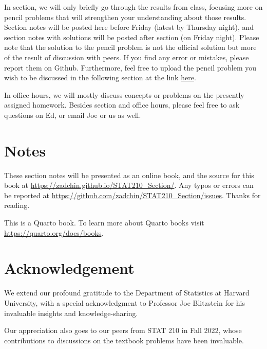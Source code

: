 \documentclass[
  letterpaper,
  DIV=11,
  numbers=noendperiod]{scrreprt}
\theoremstyle{definition}
\theoremstyle{plain}
\theoremstyle{remark}
\begin{document}
In section, we will only briefly go through the results from class,
focusing more on pencil problems that will strengthen your understanding
about those results. Section notes will be posted here before Friday
(latest by Thursday night), and section notes with solutions will be
posted after section (on Friday night). Please note that the solution to
the pencil problem is not the official solution but more of the result
of discussion with peers. If you find any error or mistakes, please
report them on Github. Furthermore, feel free to upload the pencil
problem you wish to be discussed in the following section at the link
\href{https://forms.gle/RBmMNYJp4u3qD5W79}{here}.

In office hours, we will mostly discuss concepts or problems on the
presently assigned homework. Besides section and office hours, please
feel free to ask questions on Ed, or email Joe or us as well.

\hypertarget{notes}{%
\section*{Notes}\label{notes}}


These section notes will be presented as an online book, and the source
for this book at \url{https://zadchin.github.io/STAT210_Section/}. Any
typos or errors can be reported at
\url{https://github.com/zadchin/STAT210_Section/issues}. Thanks for
reading.

This is a Quarto book. To learn more about Quarto books visit
\url{https://quarto.org/docs/books}.

\hypertarget{acknowledgement}{%
\section*{Acknowledgement}\label{acknowledgement}}


We extend our profound gratitude to the Department of Statistics at
Harvard University, with a special acknowledgment to Professor Joe
Blitzstein for his invaluable insights and knowledge-sharing.

Our appreciation also goes to our peers from STAT 210 in Fall 2022,
whose contributions to discussions on the textbook problems have been
invaluable.

\(\,\)
\end{document}

